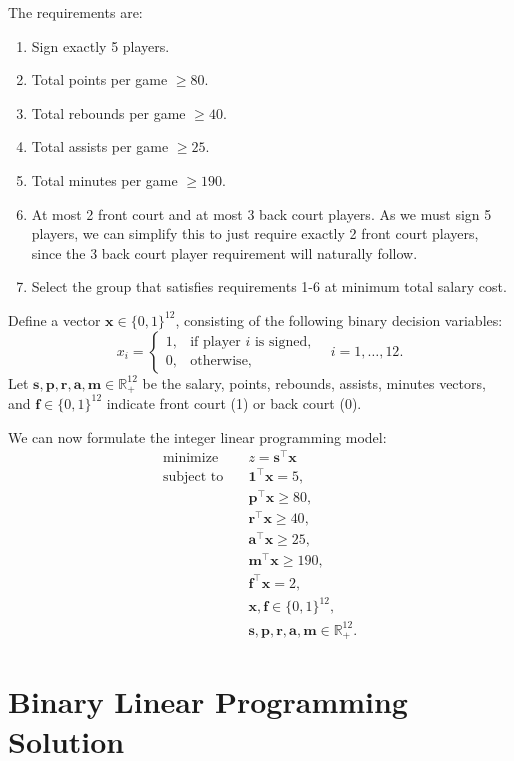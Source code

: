 \documentclass[a4paper,11pt]{article}
\begin{document}
\vspace{-0.5em}
The requirements are:
\begin{enumerate}
  \item Sign exactly 5 players.
  \item Total points per game $\ge80$.
  \item Total rebounds per game $\ge40$.
  \item Total assists per game $\ge25$.
  \item Total minutes per game $\ge190$.
  \item At most 2 front court and at most 3 back court players. As we must sign 5 players, we can simplify this to just require exactly 2 front court players, since the 3 back court player requirement will naturally follow.
  \item Select the group that satisfies requirements 1-6 at minimum total salary cost.
\end{enumerate}

Define a vector $\bm{x} \in \{0, 1\}^{12}$, consisting of the following binary decision variables:
$$x_i=\begin{cases}1,&\text{if player }i\text{ is signed,}\\0,&\text{otherwise,}\end{cases}\quad i=1,\dots,12.$$ 
Let
$\bm{s},\bm{p},\bm{r},\bm{a},\bm{m}\in\mathbb{R}_{+}^{12}$ be the salary, points, rebounds, assists, minutes vectors, and
$\bm{f}\in\{0,1\}^{12}$ indicate front court (1) or back court (0).

\vspace{1em}
We can now formulate the integer linear programming model:
\[
\begin{aligned}
\text{minimize} \quad & z=\bm{s}^\top\bm{x}\\
\text{subject to}\quad
&\bm{1}^\top\bm{x}=5,\\
&\bm{p}^\top\bm{x}\ge80,\\
&\bm{r}^\top\bm{x}\ge40,\\
&\bm{a}^\top\bm{x}\ge25,\\
&\bm{m}^\top\bm{x}\ge190,\\
&\bm{f}^\top\bm{x}=2, \\
&\bm{x}, \bm{f} \in \{0,1\}^{12}, \\
&\bm{s}, \bm{p}, \bm{r}, \bm{a}, \bm{m} \in \mathbb{R}_+^{12}.
\end{aligned}
\]

\section{Binary Linear Programming Solution}
\end{document}
